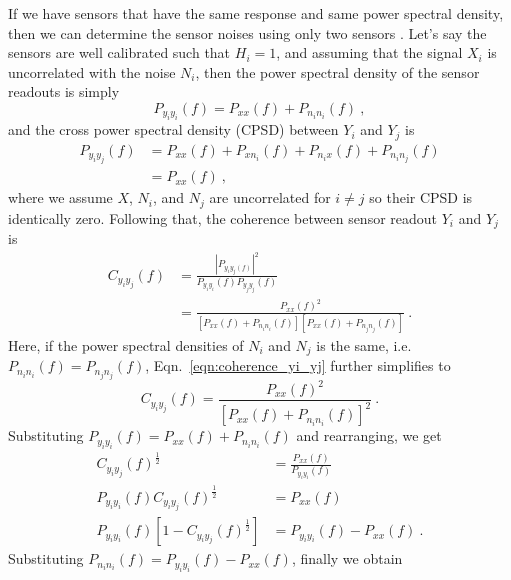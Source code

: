 If we have sensors that have the same response and same power spectral density, then we can determine the sensor noises using only two sensors \cite{technique_for_measurement_of_the_noise}.
Let's say the sensors are well calibrated such that $H_i=1$, and assuming that the signal $X_i$ is uncorrelated with the noise $N_i$, then the power spectral density of the sensor readouts is simply
\begin{equation}
	P_{y_iy_i}(f) = P_{xx}(f) + P_{n_i n_i}(f)\ ,
\end{equation}
and the cross power spectral density (CPSD) between $Y_i$ and $Y_j$ is
\begin{equation}
	\begin{split}
	P_{y_iy_j}(f) &= P_{xx}(f) + P_{xn_i}(f) + P_{n_ix}(f) + P_{n_in_j}(f) \\
	&= P_{xx}(f)\ ,
	\end{split}
\end{equation}
where we assume $X$, $N_i$, and $N_j$ are uncorrelated for $i\neq j$ so their CPSD is identically zero.
Following that, the coherence between sensor readout $Y_i$ and $Y_j$ is
\begin{equation}
	\begin{split}
	C_{y_iy_j}(f) &= \frac{\left\lvert P_{y_iy_j(f)}\right\rvert^2}{P_{y_iy_i}(f)P_{y_jy_j}(f)}\\
	&= \frac{P_{xx}(f)^2}{\left[P_{xx}(f)+P_{n_i n_i}(f)\right]\left[P_{xx}(f)+P_{n_j n_j}(f)\right]} \ .
	\end{split}
	\label{eqn:coherence_yi_yj}
\end{equation}
Here, if the power spectral densities of $N_i$ and $N_j$ is the same, i.e. $P_{n_in_i}(f)=P_{n_jn_j}(f)$, Eqn.~\eqref{eqn:coherence_yi_yj} further simplifies to
\begin{equation}
	C_{y_iy_j}(f) = \frac{P_{xx}(f)^2}{\left[P_{xx}(f)+P_{n_i n_i}(f)\right]^2}\ .
\end{equation}
Substituting $P_{y_i y_i}(f) = P_{xx}(f) + P_{n_i n_i}(f)$ and rearranging, we get
\begin{equation}
	\begin{split}
		C_{y_iy_j}(f)^\frac{1}{2} &= \frac{P_{xx}(f)}{P_{y_iy_i}(f)} \\
		P_{y_iy_i}(f)C_{y_iy_j}(f)^\frac{1}{2} &= P_{xx}(f) \\
		P_{y_iy_i}(f)\left[1-C_{y_iy_j}(f)^\frac{1}{2}\right] &= P_{y_iy_i}(f) - P_{xx}(f)\ .
	\end{split}
\end{equation}
Substituting $P_{n_i n_i}(f) = P_{y_i y_i}(f) - P_{xx}(f)$, finally we obtain
